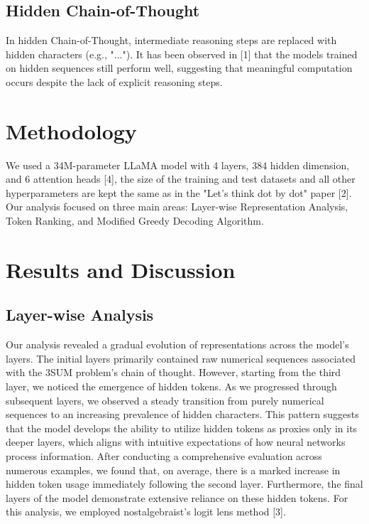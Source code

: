 \documentclass[10pt,a4paper]{article}
\begin{document}
\subsection{Hidden Chain-of-Thought}
In hidden Chain-of-Thought, intermediate reasoning steps are replaced with hidden characters (e.g., "..."). It has been observed in [1] that the models trained on hidden sequences still perform well, suggesting that meaningful computation occurs despite the lack of explicit reasoning steps.

\section{Methodology}
We used a 34M-parameter LLaMA model with 4 layers, 384 hidden dimension, and 6 attention heads [4], the size of the training and test datasets and all other hyperparameters are kept the same as in the "Let's think dot by dot" paper [2]. Our analysis focused on three main areas: Layer-wise Representation Analysis, Token Ranking, and Modified Greedy Decoding Algorithm.

\section{Results and Discussion}

\subsection{Layer-wise Analysis}
Our analysis revealed a gradual evolution of representations across the model's layers. The initial layers primarily contained raw numerical sequences associated with the 3SUM problem's chain of thought. However, starting from the third layer, we noticed the emergence of hidden tokens. As we progressed through subsequent layers, we observed a steady transition from purely numerical sequences to an increasing prevalence of hidden characters.
This pattern suggests that the model develops the ability to utilize hidden tokens as proxies only in its deeper layers, which aligns with intuitive expectations of how neural networks process information. After conducting a comprehensive evaluation across numerous examples, we found that, on average, there is a marked increase in hidden token usage immediately following the second layer. Furthermore, the final layers of the model demonstrate extensive reliance on these hidden tokens.
For this analysis, we employed nostalgebraist's logit lens method [3].
\end{document}
